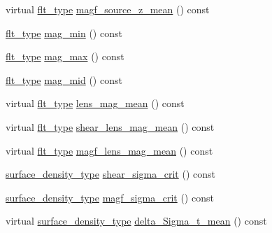 \begin{DoxyCompactItemize}
\item 
virtual \hyperlink{lib_2IceBRG__main_2common_8h_ad0f130a56eeb944d9ef2692ee881ecc4}{flt\+\_\+type} \hyperlink{classIceBRG_1_1pair__bin__summary_a4b22342ef48562c44470e7de70ae7860}{magf\+\_\+source\+\_\+z\+\_\+mean} () const 
\item 
\hyperlink{lib_2IceBRG__main_2common_8h_ad0f130a56eeb944d9ef2692ee881ecc4}{flt\+\_\+type} \hyperlink{classIceBRG_1_1pair__bin__summary_a40cc6096a80b23659359b0a58f10cae2}{mag\+\_\+min} () const 
\item 
\hyperlink{lib_2IceBRG__main_2common_8h_ad0f130a56eeb944d9ef2692ee881ecc4}{flt\+\_\+type} \hyperlink{classIceBRG_1_1pair__bin__summary_a9a13a840877d52c2eb0387e3ca7f9a70}{mag\+\_\+max} () const 
\item 
\hyperlink{lib_2IceBRG__main_2common_8h_ad0f130a56eeb944d9ef2692ee881ecc4}{flt\+\_\+type} \hyperlink{classIceBRG_1_1pair__bin__summary_afe7c6362d8892d5d0183afbe81e4ccbf}{mag\+\_\+mid} () const 
\item 
virtual \hyperlink{lib_2IceBRG__main_2common_8h_ad0f130a56eeb944d9ef2692ee881ecc4}{flt\+\_\+type} \hyperlink{classIceBRG_1_1pair__bin__summary_ac7f6568e96ca05b14958903473a5f65b}{lens\+\_\+mag\+\_\+mean} () const 
\item 
virtual \hyperlink{lib_2IceBRG__main_2common_8h_ad0f130a56eeb944d9ef2692ee881ecc4}{flt\+\_\+type} \hyperlink{classIceBRG_1_1pair__bin__summary_aa65e60d6efdb5fe7ac9d1be02c851780}{shear\+\_\+lens\+\_\+mag\+\_\+mean} () const 
\item 
virtual \hyperlink{lib_2IceBRG__main_2common_8h_ad0f130a56eeb944d9ef2692ee881ecc4}{flt\+\_\+type} \hyperlink{classIceBRG_1_1pair__bin__summary_aa8b997144d0aaefce6bfbb0fb0f6f138}{magf\+\_\+lens\+\_\+mag\+\_\+mean} () const 
\item 
\hyperlink{namespaceIceBRG_a80c597ef5ba0a32491d32a9f0083b02d}{surface\+\_\+density\+\_\+type} \hyperlink{classIceBRG_1_1pair__bin__summary_a7ddaece5334f32fe97ab2e3ed0f211e9}{shear\+\_\+sigma\+\_\+crit} () const 
\item 
\hyperlink{namespaceIceBRG_a80c597ef5ba0a32491d32a9f0083b02d}{surface\+\_\+density\+\_\+type} \hyperlink{classIceBRG_1_1pair__bin__summary_a88693451cb28ec4f8e8c67eb34a270f8}{magf\+\_\+sigma\+\_\+crit} () const 
\item 
virtual \hyperlink{namespaceIceBRG_a80c597ef5ba0a32491d32a9f0083b02d}{surface\+\_\+density\+\_\+type} \hyperlink{classIceBRG_1_1pair__bin__summary_a2a1372bfa03a186425920b839ce38f4a}{delta\+\_\+\+Sigma\+\_\+t\+\_\+mean} () const 
\item 

\end{DoxyCompactItemize}

